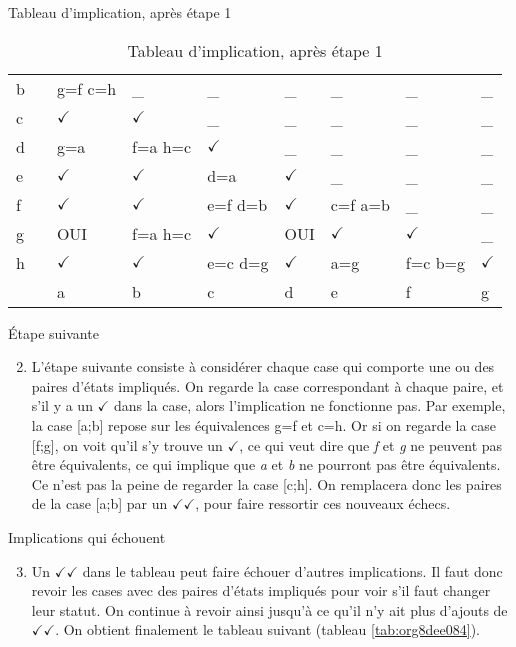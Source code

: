 \documentclass[presentation]{beamer}
\begin{document}
\begin{frame}[label={sec:org3f6bd28}]{Tableau d'implication, après étape 1}
\begin{table}[h] \scriptsize
\caption{\label{tab:org8672e31}Tableau d'implication, après étape 1}
\centering
\begin{tabular}{lllllllll}
b &  & g=f c=h & \_ & \_ & \_ & \_ & \_ & \_\\[0pt]
c &  & \(\checkmark\) & \(\checkmark\) & \_ & \_ & \_ & \_ & \_\\[0pt]
d &  & g=a & f=a h=c & \(\checkmark\) & \_ & \_ & \_ & \_\\[0pt]
e &  & \(\checkmark\) & \(\checkmark\) & d=a & \(\checkmark\) & \_ & \_ & \_\\[0pt]
f &  & \(\checkmark\) & \(\checkmark\) & e=f d=b & \(\checkmark\) & c=f a=b & \_ & \_\\[0pt]
g &  & OUI & f=a h=c & \(\checkmark\) & OUI & \(\checkmark\) & \(\checkmark\) & \_\\[0pt]
h &  & \(\checkmark\) & \(\checkmark\) & e=c d=g & \(\checkmark\) & a=g & f=c b=g & \(\checkmark\)\\[0pt]
\hline
 &  & a & b & c & d & e & f & g\\[0pt]
\end{tabular}
\end{table}
\end{frame}

\begin{frame}[label={sec:org6b7e899}]{Étape suivante}
\begin{enumerate}
\setcounter{enumi}{1}
\item L'étape suivante consiste à considérer chaque case qui comporte
une ou des paires d'états impliqués. On regarde la case
correspondant à chaque paire, et s'il y a un \(\checkmark\) dans la
case, alors l'implication ne fonctionne pas. Par exemple, la case
[a;b] repose sur les équivalences g=f et c=h. Or si on regarde la
case [f;g], on voit qu'il s'y trouve un \(\checkmark\), ce qui veut
dire que \emph{f} et \emph{g} ne peuvent pas être équivalents, ce qui
implique que \emph{a} et \emph{b} ne pourront pas être équivalents. Ce n'est
pas la peine de regarder la case [c;h].  On remplacera donc les
paires de la case [a;b] par un \(\checkmark \checkmark\), pour faire
ressortir ces nouveaux échecs.
\end{enumerate}
\end{frame}

\begin{frame}[label={sec:orgc7dfb86}]{Implications qui échouent}
\begin{enumerate}
\setcounter{enumi}{2}
\item Un \(\checkmark \checkmark\) dans le tableau peut faire échouer d'autres
implications. Il faut donc revoir les cases avec des paires d'états
impliqués pour voir s'il faut changer leur statut. On continue à
revoir ainsi jusqu'à ce qu'il n'y ait plus d'ajouts de
\(\checkmark \checkmark\). On obtient finalement le tableau suivant
(tableau \ref{tab:org8dee084}).
\end{enumerate}
\end{frame}
\end{document}
